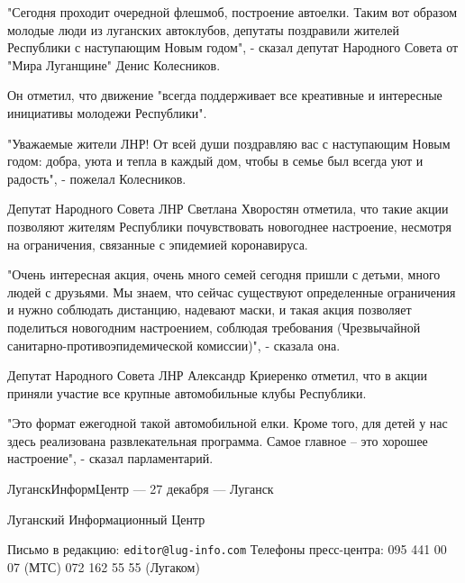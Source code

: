 "Сегодня проходит очередной флешмоб, построение автоелки. Таким вот
образом молодые люди из луганских автоклубов, депутаты поздравили жителей
Республики с наступающим Новым годом", - сказал депутат Народного Совета
от "Мира Луганщине" Денис Колесников.

Он отметил, что движение "всегда поддерживает все креативные и интересные
инициативы молодежи Республики".

"Уважаемые жители ЛНР! От всей души поздравляю вас с наступающим Новым
годом: добра, уюта и тепла в каждый дом, чтобы в семье был всегда уют и
радость", - пожелал Колесников.

Депутат Народного Совета ЛНР Светлана Хворостян отметила, что такие акции
позволяют жителям Республики почувствовать новогоднее настроение, несмотря
на ограничения, связанные с эпидемией коронавируса.

"Очень интересная акция, очень много семей сегодня пришли с детьми, много
людей с друзьями. Мы знаем, что сейчас существуют определенные ограничения
и нужно соблюдать дистанцию, надевают маски, и такая акция позволяет
поделиться новогодним настроением, соблюдая требования (Чрезвычайной
санитарно-противоэпидемической комиссии)", - сказала она.

Депутат Народного Совета ЛНР Александр Криеренко отметил, что в акции
приняли участие все крупные автомобильные клубы Республики.

"Это формат ежегодной такой автомобильной елки. Кроме того, для детей у
нас здесь реализована развлекательная программа. Самое главное – это
хорошее настроение", - сказал парламентарий.

ЛуганскИнформЦентр — 27 декабря — Луганск

Луганский Информационный Центр

Письмо в редакцию:
\verb|editor@lug-info.com|
Телефоны пресс-центра:
095 441 00 07 (МТС)
072 162 55 55 (Лугаком)
